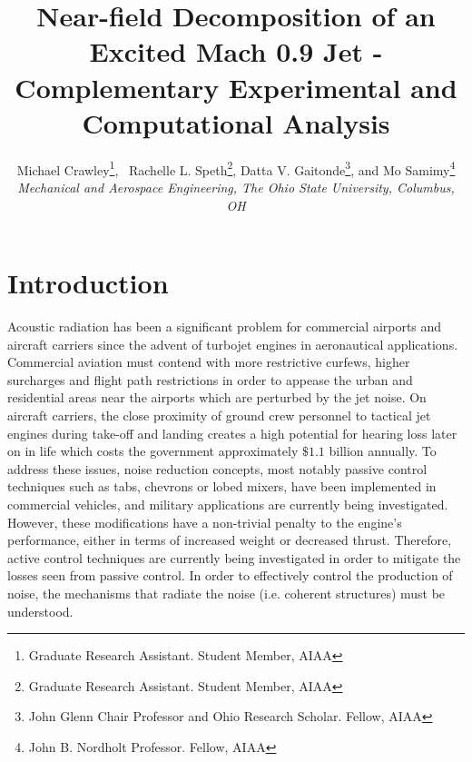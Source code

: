 \documentclass[english]{aiaa-tc}
\begin{document}
\title{Near-field Decomposition of an Excited Mach 0.9 Jet - Complementary Experimental and Computational Analysis}


\author{Michael Crawley\thanks{Graduate Research Assistant. Student Member, AIAA}, \
Rachelle L. Speth\thanks{Graduate Research Assistant. Student Member, AIAA},
 Datta V. Gaitonde\thanks{John Glenn Chair Professor and Ohio Research Scholar. Fellow, AIAA},
 and Mo Samimy\thanks{John B. Nordholt Professor. Fellow, AIAA}
\\\normalsize\itshape Mechanical and Aerospace Engineering, The Ohio State University, Columbus, OH \\}


\maketitle

\section{Introduction}

 Acoustic radiation has been a significant problem for commercial airports and aircraft carriers since the advent of turbojet engines in aeronautical applications. Commercial aviation must contend with more restrictive curfews, higher surcharges and flight path restrictions in order to appease the urban and residential areas near the airports which are perturbed by the jet noise. On aircraft carriers, the close proximity of ground crew personnel to tactical jet engines during take-off and landing creates a high potential for hearing loss later on in life which costs the government approximately $\$1.1$ billion annually.\cite{GAO2011} To address these issues, noise reduction concepts, most notably passive control techniques such as tabs, chevrons or lobed mixers, have been implemented in commercial vehicles, and military applications are currently being investigated. However, these modifications have a non-trivial penalty to the engine's performance, either in terms of increased weight or decreased thrust. Therefore, active control techniques are currently being investigated in order to mitigate the losses seen from passive control. In order to effectively control the production of noise, the mechanisms that radiate the noise (i.e. coherent structures) must be understood. 
\end{document}
